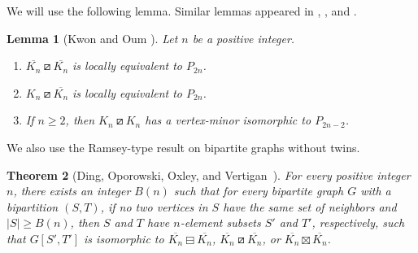 \documentclass[11pt]{article}
\newtheorem{theorem}{Theorem}[section]
\newtheorem{lemma}[theorem]{Lemma}
\newcommand\abs[1]{\lvert #1\rvert}
\newcommand\mat{\boxminus}
\newcommand\tri{\boxslash}
\newcommand\antimat{\boxtimes}
\def\K_#1{{K_{#1}}}
\def\S_#1{\overline{K_{#1}}}
\begin{document}
	We will use the following lemma. Similar lemmas appeared in \cite[Lemma 2.8]{KwonO2014}, \cite[Proposition 6.2]{HlinenyKJS2016}, and \cite[Lemma 5.6]{KKOS2018}.
\begin{lemma}[Kwon and Oum {\cite[Lemma 6.5]{KO2018sca}}]\label{lem:antimattopath} 
Let $n$ be a positive integer.
\begin{enumerate}[(1)]
	\item $\S_{n}\tri\S_{n}$ is locally equivalent to $P_{2n}$.
	\item $\K_{n}\tri\S_{n}$ is locally equivalent to $P_{2n}$.
	\item If $n\ge 2$, then $\K_{n}\tri\K_{n}$ has a vertex-minor isomorphic to $P_{2n-2}$.
\end{enumerate}
\end{lemma}
	We also use the Ramsey-type result on bipartite graphs without twins.
			\begin{theorem}[Ding, Oporowski, Oxley, and 
  Vertigan~\cite{GuoliBJD1996}]\label{thm:largebipartite}
     For every positive integer $n$,
     there exists an integer $B(n)$ 
     such that for every bipartite graph $G$ with a bipartition $(S,T)$, 
     if no two vertices in $S$ have the same set of neighbors
     and      $\abs{S}\ge B(n)$,  
     then $S$ and $T$ have $n$-element subsets $S'$ and $T'$, respectively, such that 
     $G[S',T']$ is isomorphic to $\S_{n}\mat\S_{n}$, $\S_{n}\tri \S_{n}$, or
     $\S_{n}\antimat\S_{n}$. 
\end{theorem}
	
\end{document}
